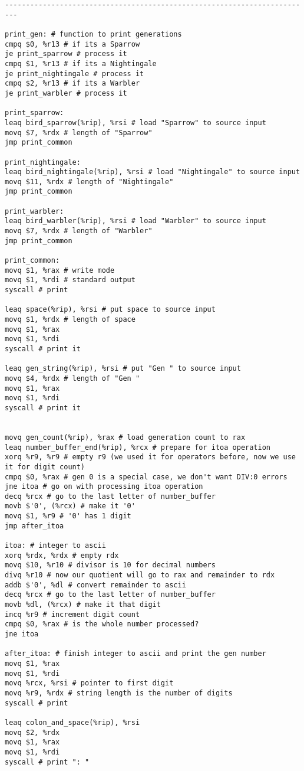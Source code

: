 \documentclass[a4paper,12pt]{article}
\begin{document}
\begin{lstlisting}[style=ATnTStyle]
-------------------------------------------------------------------------

print_gen: # function to print generations
cmpq $0, %r13 # if its a Sparrow
je print_sparrow # process it
cmpq $1, %r13 # if its a Nightingale
je print_nightingale # process it
cmpq $2, %r13 # if its a Warbler
je print_warbler # process it

print_sparrow:
leaq bird_sparrow(%rip), %rsi # load "Sparrow" to source input
movq $7, %rdx # length of "Sparrow"
jmp print_common

print_nightingale:
leaq bird_nightingale(%rip), %rsi # load "Nightingale" to source input
movq $11, %rdx # length of "Nightingale"
jmp print_common

print_warbler:
leaq bird_warbler(%rip), %rsi # load "Warbler" to source input
movq $7, %rdx # length of "Warbler"
jmp print_common

print_common:
movq $1, %rax # write mode
movq $1, %rdi # standard output
syscall # print

leaq space(%rip), %rsi # put space to source input
movq $1, %rdx # length of space
movq $1, %rax
movq $1, %rdi
syscall # print it

leaq gen_string(%rip), %rsi # put "Gen " to source input
movq $4, %rdx # length of "Gen "
movq $1, %rax
movq $1, %rdi
syscall # print it


movq gen_count(%rip), %rax # load generation count to rax
leaq number_buffer_end(%rip), %rcx # prepare for itoa operation
xorq %r9, %r9 # empty r9 (we used it for operators before, now we use it for digit count)
cmpq $0, %rax # gen 0 is a special case, we don't want DIV:0 errors
jne itoa # go on with processing itoa operation
decq %rcx # go to the last letter of number_buffer
movb $'0', (%rcx) # make it '0'
movq $1, %r9 # '0' has 1 digit
jmp after_itoa

itoa: # integer to ascii
xorq %rdx, %rdx # empty rdx
movq $10, %r10 # divisor is 10 for decimal numbers
divq %r10 # now our quotient will go to rax and remainder to rdx
addb $'0', %dl # convert remainder to ascii
decq %rcx # go to the last letter of number_buffer
movb %dl, (%rcx) # make it that digit
incq %r9 # increment digit count
cmpq $0, %rax # is the whole number processed?
jne itoa

after_itoa: # finish integer to ascii and print the gen number
movq $1, %rax
movq $1, %rdi
movq %rcx, %rsi # pointer to first digit
movq %r9, %rdx # string length is the number of digits
syscall # print

leaq colon_and_space(%rip), %rsi
movq $2, %rdx
movq $1, %rax
movq $1, %rdi
syscall # print ": "


\end{lstlisting}
\end{document}
